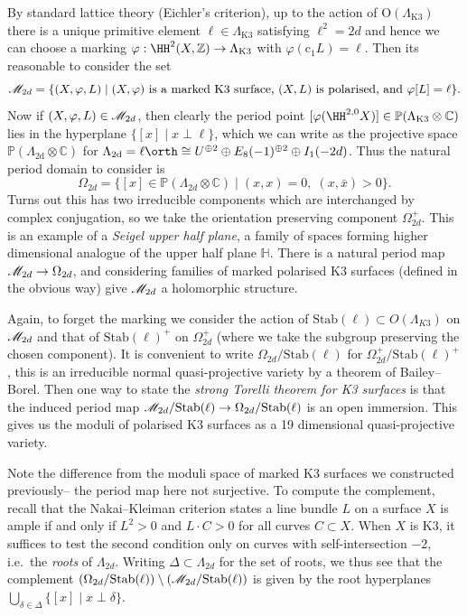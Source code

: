 By standard lattice theory (Eichler's criterion), up to the action of
\(\text{O}(\Lambda_\text{K3})\) there is a unique primitive element \(\ell\in
\Lambda_\text{K3}\) satisfying \(\ell^2=2d\) and hence we can choose a marking
\(\varphi:\HH^2(X,\mathbb{Z})\to \Lambda_\text{K3}\) with
\(\varphi(\text{c}_1L)=\ell\). Then its reasonable to consider the set
\[
    \mathscr{M}_{2d}= \{(X,\varphi,L)\;|\; (X,\varphi)\text{ is a
    marked K3 surface, }(X,L)\text{ is polarised, and }\varphi[L]=\ell\}.
\]
Now if \((X,\varphi,L)\in \mathscr{M}_{2d}\), then clearly the period point
\([\varphi(\HH^{2,0}X)]\in \mathbb{P}(\Lambda_\text{K3}\otimes \mathbb{C})\)
lies in the hyperplane \(\{[x]\;|\; x \perp \ell\}\), which we can write as the
projective space \(\mathbb{P}(\Lambda_\text{2d}\otimes \mathbb{C})\) for
\(\Lambda_\text{2d}=\ell\orth \cong U^{\oplus 2}\oplus E_8(-1)^{\oplus 2}\oplus
I_1(-2d)\). Thus the natural period domain to consider is
\[
    \Omega_{2d}=\{[x]\in \mathbb{P}(\Lambda_{2d}\otimes \mathbb{C})\;|\;
    (x,x)=0,\; (x,\bar x)>0\}.
\]
Turns out this has two irreducible components which are interchanged by complex
conjugation, so we take the orientation preserving component \(\Omega_{2d}^+\).
This is an example of a \textit{Seigel upper half plane}, a family of spaces
forming higher dimensional analogue of the upper half plane \(\mathbb{H}\).
There is a natural period map \(\mathscr{M}_{2d}\to \Omega_{2d}\), and considering
families of marked polarised K3 surfaces (defined in the obvious way) give
\(\mathscr{M}_{2d}\) a holomorphic structure.

Again, to forget the marking we consider the action of
\(\text{Stab}(\ell)\subset O(\Lambda_{K3})\) on \(\mathscr{M}_{2d}\) and that of
\(\text{Stab}(\ell)^+\) on \(\Omega_{2d}^+\) (where we take the subgroup
preserving the chosen component).  It is convenient to write
\(\Omega_{2d}/\text{Stab}(\ell)\) for \(\Omega_{2d}^+/\text{Stab}(\ell)^+\),
this is an irreducible normal quasi-projective variety by a theorem of
Bailey--Borel. Then one way to state the \textit{strong Torelli theorem for K3
surfaces} is that the induced period map \(\mathscr{M}_{2d}/\text{Stab}(\ell)\to
\Omega_{2d}/\text{Stab}(\ell)\) is an open immersion. This gives us the moduli
of polarised K3 surfaces as a 19 dimensional quasi-projective variety.

Note the difference from the moduli space of marked K3 surfaces we constructed
previously-- the period map here not surjective. To compute the complement, recall that the Nakai--Kleiman criterion states a
line bundle \(L\) on a surface \(X\) is ample if and only if \(L^2>0\) and
\(L\cdot C>0\) for all curves \( C\subset X\). When \(X\) is K3, it suffices
to test the second condition only on curves with self-intersection \(-2\), i.e.\
the \textit{roots} of \(\Lambda_{2d}\). Writing \(\Delta\subset \Lambda_{2d}\)
for the set of roots, we thus see that the complement
\((\Omega_{2d}/\text{Stab}(\ell)) \setminus (\mathscr{M}_{2d}/\text{Stab}(\ell))\)
is given by the root hyperplanes
\(\bigcup_{\delta \in \Delta}\{[x]\;|\; x\perp \delta\}\).

